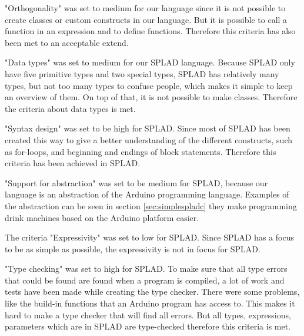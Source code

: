 "Orthogonality" was set to medium for our language since it is not possible to create classes or custom constructs in our language. But it is possible to call a function in an expression and to define functions. Therefore this criteria has also been met to an acceptable extend.

"Data types" was set to medium for our SPLAD language. Because SPLAD only have five primitive types and two special types, SPLAD has relatively many types, but not too many types to confuse people, which makes it simple to keep an overview of them. On top of that, it is not possible to make classes. Therefore the criteria about data types is met.

"Syntax design" was set to be high for SPLAD. Since most of SPLAD has been created this way to give a better understanding of the different constructs, such as for-loops, and beginning and endings of block statements. Therefore this criteria has been achieved in SPLAD.

"Support for abstraction" was set to be medium for SPLAD, because our language is an abstraction of the Arduino programming language. Examples of the abstraction can be seen in section \ref{sec:simplespladc} they make programming drink machines based on the Arduino platform easier.

The criteria "Expressivity" was set to low for SPLAD. Since SPLAD has a focus to be as simple as possible, the expressivity is not in focus for SPLAD. 

"Type checking" was set to high for SPLAD. To make sure that all type errors that could be found are found when a program is compiled, a lot of work and tests have been made while creating the type checker. There were some problems, like the build-in functions that an Arduino program has access to. This makes it hard to make a type checker that will find all errors. But all types, expressions, parameters which are in SPLAD are type-checked therefore this criteria is met. 